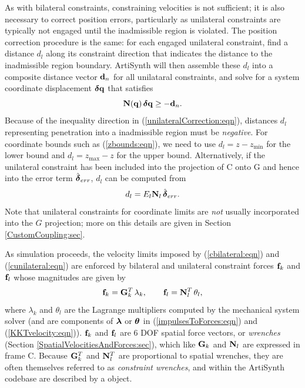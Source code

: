 As with bilateral constraints, constraining velocities is not
sufficient; it is also necessary to correct position errors,
particularly as unilateral constraints are typically not engaged until
the inadmissible region is violated. The position correction procedure
is the same: for each engaged unilateral constraint, find a distance
$d_l$ along its constraint direction that indicates the distance to
the inadmissible region boundary.  ArtiSynth will then assemble these
$d_l$ into a composite distance vector ${\bf d}_n$ for all unilataral
constraints, and solve for a system coordinate displacement $\boldsymbol\delta {\bf q}$
that satisfies
%
\begin{equation}
{\bf N}({\bf q}) \, \boldsymbol\delta {\bf q} \ge -{\bf d}_n.
\label{unilateralCorrection:eqn}
\end{equation}
%
Because of the inequality direction in
(\ref{unilateralCorrection:eqn}), distances $d_l$ representing
penetration into a inadmissible region must be {\it negative}.  For
coordinate bounds such as (\ref{zbounds:eqn}), we need to use $d_l = z
- z_\text{min}$ for the lower bound and $d_l = z_\text{max} - z$ for
the upper bound. Alternatively, if the unilateral constraint has been
included into the projection of C onto G and hence into the error term
$\hat{\boldsymbol\delta}_{err}$, $d_l$ can be computed from
%
\begin{equation}
d_l = E_l {\bf N}_l \, \hat{\boldsymbol\delta}_{err}.
\end{equation}
%
Note that unilateral constraints for coordinate limits are {\it not}
usually incorporated into the $G$ projection; more on this details are
given in Section \ref{CustomCoupling:sec}.

As simulation proceeds, the velocity limits imposed by
(\ref{cbilateral:eqn}) and (\ref{cunilateral:eqn}) are enforced by
bilateral and unilateral 
constraint forces ${\bf f}_k$ and ${\bf f}_l$ whose
magnitudes are given by
%
\begin{equation}
{\bf f}_k = {\bf G}_k^T \, \lambda_k, \qquad {\bf f}_l = {\bf N}_l^T \, \theta_l,
\end{equation}
%
where $\lambda_k$ and $\theta_l$ are the Lagrange multipliers computed
by the mechanical system solver (and are components of $\boldsymbol\lambda$ or
$\boldsymbol\theta$ in (\ref{impulsesToForces:eqn}) and (\ref{KKTvelocity:eqn})).
${\bf f}_k$ and ${\bf f}_l$ are 6 DOF spatial force vectors, or {\it wrenches}
(Section \ref{SpatialVelocitiesAndForces:sec}), which like ${\bf G}_k$ and
${\bf N}_l$ are expressed in frame C. Because ${\bf G}_k^T$ and ${\bf N}_l^T$ are
proportional to spatial wrenches, they are often themselves referred
to as {\it constraint wrenches}, and within the ArtiSynth codebase are
described by a  object.

